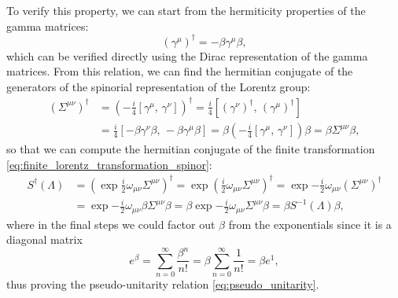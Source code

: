 To verify this property, we can start from the hermiticity properties of the gamma matrices:
\[
    (\gamma^{\mu})^{\dagger} = - \beta \gamma^{\mu} \beta,
\]
which can be verified directly using the Dirac representation of the gamma matrices. From this relation, we can find the hermitian conjugate of the generators of the spinorial representation of the Lorentz group:
\[
    \begin{aligned}
        (\Sigma^{\mu \nu})^{\dagger} & = \left(-\frac{i}{4} \left[\gamma^{\mu},\, \gamma^{\nu}\right]\right)^{\dagger} = \frac{i}{4} \left[(\gamma^{\nu})^{\dagger},\, (\gamma^{\mu})^{\dagger}\right]                                     \\
                                     & = \frac{i}{4} \left[-\beta \gamma^{\nu} \beta,\, -\beta \gamma^{\mu} \beta\right] = \beta \left(-\frac{i}{4} \left[\gamma^{\mu},\, \gamma^{\nu}\right]\right) \beta = \beta \Sigma^{\mu \nu} \beta,
    \end{aligned}
\]
so that we can compute the hermitian conjugate of the finite transformation \eqref{eq:finite_lorentz_transformation_spinor}:
\[
    \begin{aligned}
        S^{\dagger}(\Lambda) & = \left(\exp{\frac{i}{2} \omega_{\mu \nu} \Sigma^{\mu \nu}}\right)^{\dagger} = \exp{\left(\frac{i}{2} \omega_{\mu \nu} \Sigma^{\mu \nu}\right)^{\dagger}} = \exp{-\frac{i}{2} \omega_{\mu \nu} (\Sigma^{\mu \nu})^{\dagger}} \\
                             & = \exp{-\frac{i}{2} \omega_{\mu \nu} \beta \Sigma^{\mu \nu} \beta} = \beta \exp{-\frac{i}{2} \omega_{\mu \nu} \Sigma^{\mu \nu}} \beta = \beta S^{-1}(\Lambda) \beta,
    \end{aligned}
\]
where in the final steps we could factor out \(\beta\) from the exponentials since it is a diagonal matrix
\[
    e^{\beta} = \sum_{n=0}^{\infty} \frac{\beta^n}{n!} = \beta \sum_{n=0}^{\infty} \frac{1}{n!} = \beta e^{1},
\]
thus proving the pseudo-unitarity relation \eqref{eq:pseudo_unitarity}.

